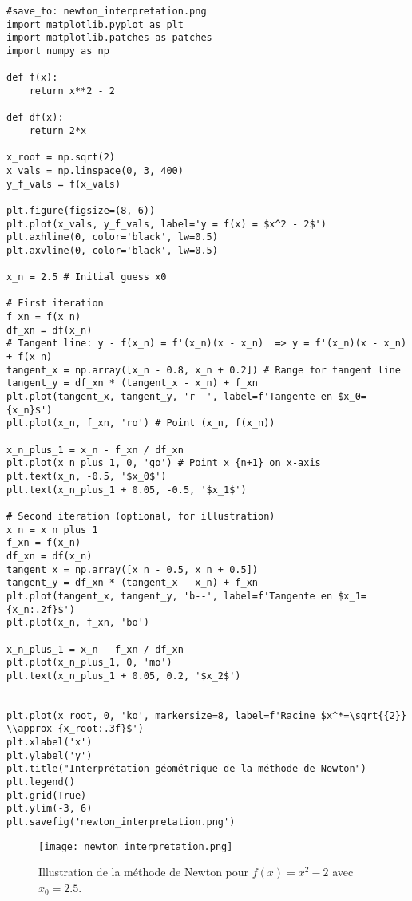 \begin{verbatim}
#save_to: newton_interpretation.png
import matplotlib.pyplot as plt
import matplotlib.patches as patches
import numpy as np

def f(x):
    return x**2 - 2

def df(x):
    return 2*x

x_root = np.sqrt(2)
x_vals = np.linspace(0, 3, 400)
y_f_vals = f(x_vals)

plt.figure(figsize=(8, 6))
plt.plot(x_vals, y_f_vals, label='y = f(x) = $x^2 - 2$')
plt.axhline(0, color='black', lw=0.5)
plt.axvline(0, color='black', lw=0.5)

x_n = 2.5 # Initial guess x0

# First iteration
f_xn = f(x_n)
df_xn = df(x_n)
# Tangent line: y - f(x_n) = f'(x_n)(x - x_n)  => y = f'(x_n)(x - x_n) + f(x_n)
tangent_x = np.array([x_n - 0.8, x_n + 0.2]) # Range for tangent line
tangent_y = df_xn * (tangent_x - x_n) + f_xn
plt.plot(tangent_x, tangent_y, 'r--', label=f'Tangente en $x_0={x_n}$')
plt.plot(x_n, f_xn, 'ro') # Point (x_n, f(x_n))

x_n_plus_1 = x_n - f_xn / df_xn
plt.plot(x_n_plus_1, 0, 'go') # Point x_{n+1} on x-axis
plt.text(x_n, -0.5, '$x_0$')
plt.text(x_n_plus_1 + 0.05, -0.5, '$x_1$')

# Second iteration (optional, for illustration)
x_n = x_n_plus_1
f_xn = f(x_n)
df_xn = df(x_n)
tangent_x = np.array([x_n - 0.5, x_n + 0.5])
tangent_y = df_xn * (tangent_x - x_n) + f_xn
plt.plot(tangent_x, tangent_y, 'b--', label=f'Tangente en $x_1={x_n:.2f}$')
plt.plot(x_n, f_xn, 'bo')

x_n_plus_1 = x_n - f_xn / df_xn
plt.plot(x_n_plus_1, 0, 'mo')
plt.text(x_n_plus_1 + 0.05, 0.2, '$x_2$')


plt.plot(x_root, 0, 'ko', markersize=8, label=f'Racine $x^*=\sqrt{{2}} \\approx {x_root:.3f}$')
plt.xlabel('x')
plt.ylabel('y')
plt.title("Interprétation géométrique de la méthode de Newton")
plt.legend()
plt.grid(True)
plt.ylim(-3, 6)
plt.savefig('newton_interpretation.png')
\end{verbatim}

\begin{figure}[H]
\centering
\texttt{[image: newton\_interpretation.png]}
\caption{Illustration de la méthode de Newton pour $f(x) = x^2 - 2$ avec $x_0 = 2.5$.}
\label{fig:newton_interpretation}
\end{figure}

